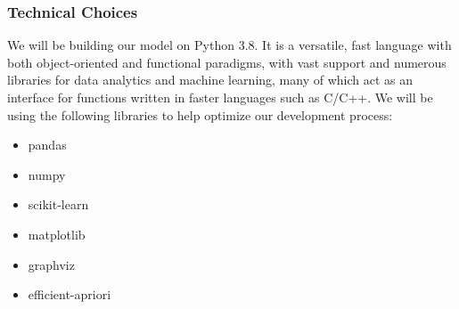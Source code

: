 \documentclass[a4paper,11pt]{article}
\begin{document}
\subsubsection{Technical Choices}
We will be building our model on Python 3.8. It is a versatile, fast language with both object-oriented and functional paradigms, with vast support and numerous libraries for data analytics and machine learning, many of which act as an interface for functions written in faster languages such as C/C++. We will be using the following libraries to help optimize our development process:
\begin{itemize}
\item pandas
\item numpy
\item scikit-learn
\item matplotlib
\item graphviz
\item efficient-apriori
\end{itemize}
\end{document}
